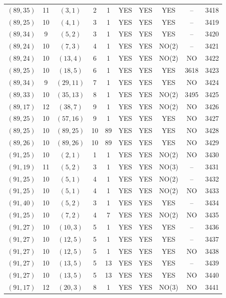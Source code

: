 \begin{longtable}{|c|c|c|c|c|c|c|c|c|c|}
$(89, 35)$ & 11 & $(3, 1)$ & 2 & 1 & YES & YES & YES & -- & 3418\\
$(89, 25)$ & 10 & $(4, 1)$ & 3 & 1 & YES & YES & YES & -- & 3419\\
$(89, 34)$ & 9 & $(5, 2)$ & 3 & 1 & YES & YES & YES & -- & 3420\\
$(89, 24)$ & 10 & $(7, 3)$ & 4 & 1 & YES & YES & NO(2) & -- & 3421\\
$(89, 24)$ & 10 & $(13, 4)$ & 6 & 1 & YES & YES & NO(2) & NO & 3422\\
$(89, 25)$ & 10 & $(18, 5)$ & 6 & 1 & YES & YES & YES & 3618 & 3423\\
$(89, 34)$ & 9 & $(29, 11)$ & 7 & 1 & YES & YES & YES & NO & 3424\\
$(89, 33)$ & 10 & $(35, 13)$ & 8 & 1 & YES & YES & NO(2) & 3495 & 3425\\
$(89, 17)$ & 12 & $(38, 7)$ & 9 & 1 & YES & YES & NO(2) & NO & 3426\\
$(89, 25)$ & 10 & $(57, 16)$ & 9 & 1 & YES & YES & YES & NO & 3427\\
$(89, 25)$ & 10 & $(89, 25)$ & 10 & 89 & YES & YES & YES & NO & 3428\\
$(89, 26)$ & 10 & $(89, 26)$ & 10 & 89 & YES & YES & YES & NO & 3429\\
$(91, 25)$ & 10 & $(2, 1)$ & 1 & 1 & YES & YES & NO(2) & NO & 3430\\
$(91, 19)$ & 11 & $(5, 2)$ & 3 & 1 & YES & YES & NO(3) & -- & 3431\\
$(91, 25)$ & 10 & $(5, 1)$ & 4 & 1 & YES & YES & NO(2) & -- & 3432\\
$(91, 25)$ & 10 & $(5, 1)$ & 4 & 1 & YES & YES & NO(2) & NO & 3433\\
$(91, 40)$ & 10 & $(5, 2)$ & 3 & 1 & YES & YES & YES & -- & 3434\\
$(91, 25)$ & 10 & $(7, 2)$ & 4 & 7 & YES & YES & NO(2) & NO & 3435\\
$(91, 27)$ & 10 & $(10, 3)$ & 5 & 1 & YES & YES & YES & -- & 3436\\
$(91, 27)$ & 10 & $(12, 5)$ & 5 & 1 & YES & YES & YES & -- & 3437\\
$(91, 27)$ & 10 & $(12, 5)$ & 5 & 1 & YES & YES & YES & NO & 3438\\
$(91, 27)$ & 10 & $(13, 5)$ & 5 & 13 & YES & YES & YES & -- & 3439\\
$(91, 27)$ & 10 & $(13, 5)$ & 5 & 13 & YES & YES & YES & NO & 3440\\
$(91, 17)$ & 12 & $(20, 3)$ & 8 & 1 & YES & YES & NO(3) & NO & 3441\\

\end{longtable}
